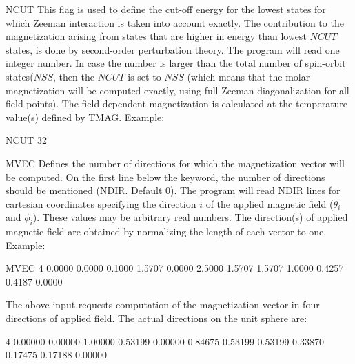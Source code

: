 \begin{keywordlist}
\item[NCUT]
This flag is used to define the cut-off energy for the lowest states for which
Zeeman interaction is taken into account exactly. The contribution to the magnetization
arising from states that are higher in energy than lowest $NCUT$ states, is done by
second-order perturbation theory. The program will read one integer number. In case the number
is larger than the total number of spin-orbit states($NSS$, then the $NCUT$ is set to $NSS$
(which means that the molar magnetization will be computed exactly, using full Zeeman
diagonalization for all field points). The field-dependent magnetization is calculated at
the temperature value(s) defined by TMAG.
Example:
\begin{inputlisting}
NCUT
32
\end{inputlisting}




\item[MVEC]
Defines the number of directions for which the magnetization vector will be computed.
On the first line below the keyword, the number of directions should be mentioned (NDIR. Default 0).
The program will read NDIR lines for cartesian coordinates specifying the direction $i$ of the
applied magnetic field ($\theta_i$ and $\phi_i$). These values may be arbitrary real numbers.
The direction(s) of applied magnetic field are obtained by normalizing the length of each vector to one.
Example:
\begin{inputlisting}
MVEC
4
0.0000  0.0000   0.1000
1.5707  0.0000   2.5000
1.5707  1.5707   1.0000
0.4257  0.4187   0.0000
\end{inputlisting}
The above input requests computation of the magnetization vector in four directions of applied field.
The actual directions on the unit sphere are:
\begin{sourcelisting}
4
0.00000  0.00000  1.00000
0.53199  0.00000  0.84675
0.53199  0.53199  0.33870
0.17475  0.17188  0.00000
\end{sourcelisting}



\end{keywordlist}

